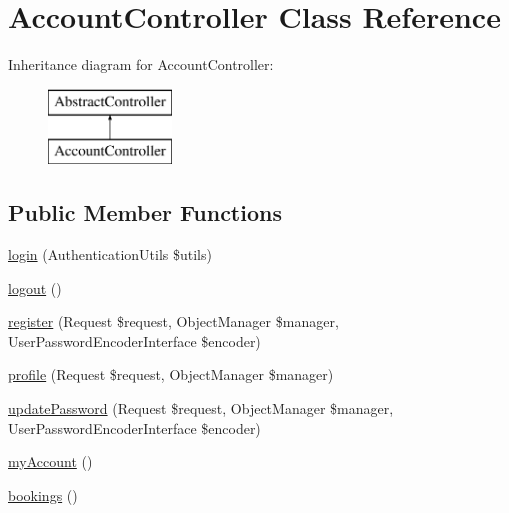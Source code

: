 \hypertarget{class_app_1_1_controller_1_1_account_controller}{}\section{Account\+Controller Class Reference}
\label{class_app_1_1_controller_1_1_account_controller}
Inheritance diagram for Account\+Controller\+:\begin{figure}[H]
\begin{center}
\leavevmode
\includegraphics[height=2.000000cm]{class_app_1_1_controller_1_1_account_controller}
\end{center}
\end{figure}
\subsection*{Public Member Functions}
\begin{DoxyCompactItemize}
\item 
\mbox{\hyperlink{class_app_1_1_controller_1_1_account_controller_a8450f41ecb91498fc9e3bce1d9d65ab9}{login}} (Authentication\+Utils \$utils)
\item 
\mbox{\hyperlink{class_app_1_1_controller_1_1_account_controller_a082405d89acd6835c3a7c7a08a7adbab}{logout}} ()
\item 
\mbox{\hyperlink{class_app_1_1_controller_1_1_account_controller_a90ecc2d541bdc4c5178f2d0bb48899e5}{register}} (Request \$request, Object\+Manager \$manager, User\+Password\+Encoder\+Interface \$encoder)
\item 
\mbox{\hyperlink{class_app_1_1_controller_1_1_account_controller_ab03aece09ce75dc5cf354f4dae008dd7}{profile}} (Request \$request, Object\+Manager \$manager)
\item 
\mbox{\hyperlink{class_app_1_1_controller_1_1_account_controller_a359d94aeff6cd7be80cd365c9300bd37}{update\+Password}} (Request \$request, Object\+Manager \$manager, User\+Password\+Encoder\+Interface \$encoder)
\item 
\mbox{\hyperlink{class_app_1_1_controller_1_1_account_controller_ac7254446c02ace98cda87a70e2a2e429}{my\+Account}} ()
\item 
\mbox{\hyperlink{class_app_1_1_controller_1_1_account_controller_a0f99f07a00cb13e77cd7aa42d1ee5b43}{bookings}} ()
\end{DoxyCompactItemize}



